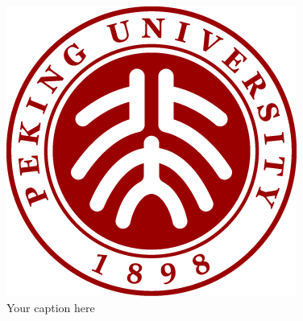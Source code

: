 \begin{figure}[htbp]
    \centering
    \includegraphics[width=0.6\linewidth, height=0.4\textheight]{./figure/pku-logo.png}
    \caption{Your caption here}\label{fig:mylabel}
\end{figure}
  